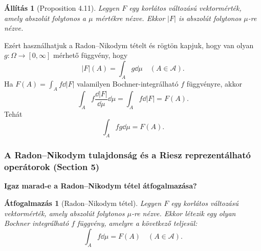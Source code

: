 \documentclass{beamer} %
\newtheorem{allitas}[lem]{Állítás}
\newtheorem{atfog}[lem]{Átfogalmazás}
\begin{document}
\begin{frame}
\justifying
\begin{allitas}[Proposition 4.11] Legyen $F$ egy korlátos változású vektormérték, amely abszolút folytonos a $\mu$ mértékre nézve. Ekkor $|F|$ is abszolút folytonos $\mu$-re nézve.
\end{allitas}
\pause Ezért használhatjuk a Radon\---Nikodym tételt és rögtön kapjuk, hogy van olyan $g \colon \Omega \to [0,\infty]$ mérhető függvény, hogy
$$|F|(A) = \int_{A} g \dd{\mu} \quad (A \in \mathcal{A}).$$ \pause Ha $F(A) = \int_{A} f \dd{|F|}$ valamilyen Bochner-integrálható $f$ függvényre, akkor
\pause $$\int_{A} f \frac{\dd{|F|}}{\dd{\mu}} \dd{\mu} = \int_{A} f \dd{|F|} = F(A).$$
\pause Tehát 
$$\int_{A} fg \dd{\mu} = F(A).$$
\end{frame}

\begin{frame}
\frametitle{A Radon\---Nikodym tulajdonság és a Riesz reprezentálható operátorok (Section 5)}
\justifying
\textbf{Igaz marad-e a Radon\---Nikodym tétel átfogalmazása?}
\pause \begin{atfog}[Radon\---Nikodym tétel] Legyen $F$ egy korlátos változású vektormérték, amely abszolút folytonos $\mu$-re nézve. Ekkor létezik egy olyan Bochner integrálható $f$ függvény, amelyre a következő teljesül:
$$\int_{A} f \dd{\mu} = F(A) \quad (A \in \mathcal{A}).$$
\end{atfog}
\end{frame}
\end{document}
